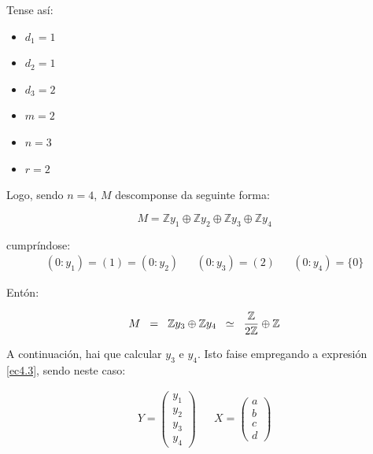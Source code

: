\documentclass[twoside]{report}
\theoremstyle{mystyle}
\begin{document}
\vspace{3mm}

\noindent Tense así:

\begin{multicols}{3}
\begin{itemize}
    \item $d_{1} = 1$
    \item $d_{2} = 1$
    \item $d_{3} = 2$
    \item $m = 2$
    \item $n = 3$
    \item $r = 2$
\end{itemize}
\end{multicols}

\vspace{3mm}

\noindent Logo, sendo $n = 4$, $M$ descomponse da seguinte forma:

$$M = \mathbb{Z}y_{1} \oplus \mathbb{Z}y_{2} \oplus \mathbb{Z}y_{3} \oplus \mathbb{Z}y_{4}$$

\pagebreak

\noindent cumpríndose:
\begin{align*}
    (0 : y_{1}) = (1) = (0 : y_{2}) & & (0 : y_{3}) = (2) & & (0 : y_{4}) = \{0\}
\end{align*}

\vspace{3mm}

\noindent Entón:

$$M \hspace{2mm} = \hspace{2mm} \mathbb{Z}y_{3} \oplus \mathbb{Z}y_{4} \hspace{2mm} \simeq \hspace{2mm} \displaystyle \frac{\mathbb{Z}}{2\mathbb{Z}} \oplus \mathbb{Z}$$

\vspace{3mm}

\noindent A continuación, hai que calcular $y_{3}$ e $y_{4}$. Isto faise empregando a expresión \eqref{ec4.3}, sendo neste caso:

\begin{align*}
    Y = 
    \begin{pmatrix}
    y_{1}\\ y_{2} \\ y_{3} \\ y_{4}
    \end{pmatrix}
    & & 
    X = 
    \begin{pmatrix}
    a \\ b \\ c \\ d
    \end{pmatrix}
\end{align*}
\end{document}
